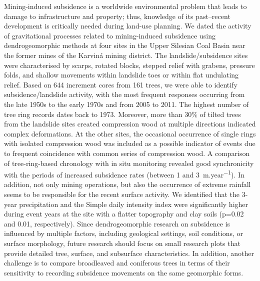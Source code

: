 {Mining-induced subsidence is a worldwide environmental problem that leads to damage to infrastructure and property; thus, knowledge of its past–recent development is critically needed during land-use planning. We dated the activity of gravitational processes related to mining-induced subsidence using dendrogeomorphic methods at four sites in the Upper Silesian Coal Basin near the former mines of the Karviná mining district. The landslide/subsidence sites were characterised by scarps, rotated blocks, stepped relief with grabens, pressure folds, and shallow movements within landslide toes or within flat undulating relief. Based on 644 increment cores from 161 trees, we were able to identify subsidence/landslide activity, with the most frequent responses occurring from the late 1950s to the early 1970s and from 2005 to 2011. The highest number of tree ring records dates back to 1973. Moreover, more than 30\% of tilted trees from the landslide sites created compression wood at multiple directions indicated complex deformations. At the other sites, the occasional occurrence of single rings with isolated compression wood was included as a possible indicator of events due to frequent coincidence with common series of compression wood. A comparison of tree-ring-based chronology with in situ monitoring revealed good synchronicity with the periods of increased subsidence rates (between 1 and 3~m.year\textsuperscript{−1}). In addition, not only mining operations, but also the occurrence of extreme rainfall seems to be responsible for the recent surface activity. We identified that the 3-year precipitation and the Simple daily intensity index were significantly higher during event years at the site with a flatter topography and clay soils (p=0.02 and 0.01, respectively). Since dendrogeomorphic research on subsidence is influenced by multiple factors, including geological settings, soil conditions, or surface morphology, future research should focus on small research plots that provide detailed tree, surface, and subsurface characteristics. In addition, another challenge is to compare broadleaved and coniferous trees in terms of their sensitivity to recording subsidence movements on the same geomorphic forms.
}%
{}%

